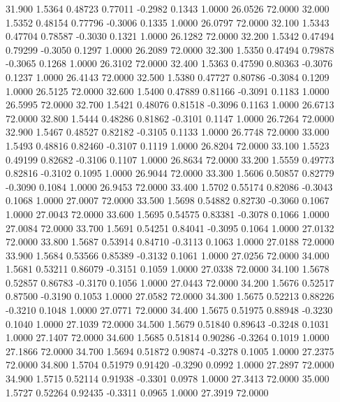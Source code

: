  31.900   1.5364   0.48723   0.77011  -0.2982   0.1343   1.0000  26.0526  72.0000
  32.000   1.5352   0.48154   0.77796  -0.3006   0.1335   1.0000  26.0797  72.0000
  32.100   1.5343   0.47704   0.78587  -0.3030   0.1321   1.0000  26.1282  72.0000
  32.200   1.5342   0.47494   0.79299  -0.3050   0.1297   1.0000  26.2089  72.0000
  32.300   1.5350   0.47494   0.79878  -0.3065   0.1268   1.0000  26.3102  72.0000
  32.400   1.5363   0.47590   0.80363  -0.3076   0.1237   1.0000  26.4143  72.0000
  32.500   1.5380   0.47727   0.80786  -0.3084   0.1209   1.0000  26.5125  72.0000
  32.600   1.5400   0.47889   0.81166  -0.3091   0.1183   1.0000  26.5995  72.0000
  32.700   1.5421   0.48076   0.81518  -0.3096   0.1163   1.0000  26.6713  72.0000
  32.800   1.5444   0.48286   0.81862  -0.3101   0.1147   1.0000  26.7264  72.0000
  32.900   1.5467   0.48527   0.82182  -0.3105   0.1133   1.0000  26.7748  72.0000
  33.000   1.5493   0.48816   0.82460  -0.3107   0.1119   1.0000  26.8204  72.0000
  33.100   1.5523   0.49199   0.82682  -0.3106   0.1107   1.0000  26.8634  72.0000
  33.200   1.5559   0.49773   0.82816  -0.3102   0.1095   1.0000  26.9044  72.0000
  33.300   1.5606   0.50857   0.82779  -0.3090   0.1084   1.0000  26.9453  72.0000
  33.400   1.5702   0.55174   0.82086  -0.3043   0.1068   1.0000  27.0007  72.0000
  33.500   1.5698   0.54882   0.82730  -0.3060   0.1067   1.0000  27.0043  72.0000
  33.600   1.5695   0.54575   0.83381  -0.3078   0.1066   1.0000  27.0084  72.0000
  33.700   1.5691   0.54251   0.84041  -0.3095   0.1064   1.0000  27.0132  72.0000
  33.800   1.5687   0.53914   0.84710  -0.3113   0.1063   1.0000  27.0188  72.0000
  33.900   1.5684   0.53566   0.85389  -0.3132   0.1061   1.0000  27.0256  72.0000
  34.000   1.5681   0.53211   0.86079  -0.3151   0.1059   1.0000  27.0338  72.0000
  34.100   1.5678   0.52857   0.86783  -0.3170   0.1056   1.0000  27.0443  72.0000
  34.200   1.5676   0.52517   0.87500  -0.3190   0.1053   1.0000  27.0582  72.0000
  34.300   1.5675   0.52213   0.88226  -0.3210   0.1048   1.0000  27.0771  72.0000
  34.400   1.5675   0.51975   0.88948  -0.3230   0.1040   1.0000  27.1039  72.0000
  34.500   1.5679   0.51840   0.89643  -0.3248   0.1031   1.0000  27.1407  72.0000
  34.600   1.5685   0.51814   0.90286  -0.3264   0.1019   1.0000  27.1866  72.0000
  34.700   1.5694   0.51872   0.90874  -0.3278   0.1005   1.0000  27.2375  72.0000
  34.800   1.5704   0.51979   0.91420  -0.3290   0.0992   1.0000  27.2897  72.0000
  34.900   1.5715   0.52114   0.91938  -0.3301   0.0978   1.0000  27.3413  72.0000
  35.000   1.5727   0.52264   0.92435  -0.3311   0.0965   1.0000  27.3919  72.0000
